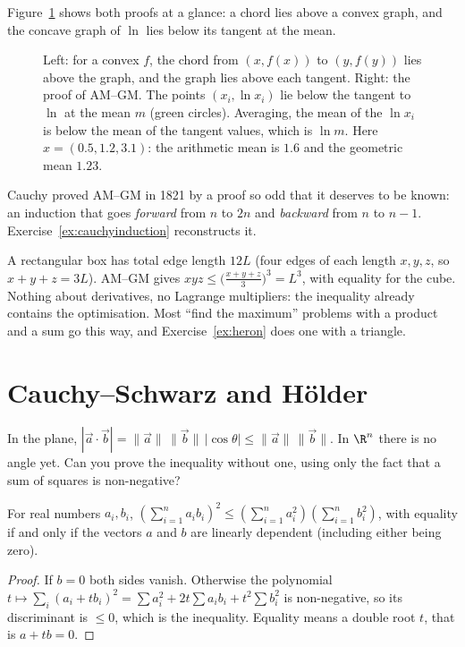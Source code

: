 Figure~\ref{fig:convex} shows both proofs at a glance: a chord lies above a convex graph, and the concave graph of $\ln$ lies below its tangent at the mean.

\begin{figure}[ht]
\centering
{}
\caption{Left: for a convex $f$, the chord from $(x,f(x))$ to $(y,f(y))$ lies above the graph, and the graph lies above each tangent. Right: the proof of AM--GM. The points $(x_i,\ln x_i)$ lie below the tangent to $\ln$ at the mean $m$ (green circles). Averaging, the mean of the $\ln x_i$ is below the mean of the tangent values, which is $\ln m$. Here $x=(0.5,1.2,3.1)$: the arithmetic mean is $1.6$ and the geometric mean $1.23$.}
\label{fig:convex}
\end{figure}

Cauchy proved AM--GM in 1821 by a proof so odd that it deserves to be known: an induction that goes \emph{forward} from $n$ to $2n$ and
\emph{backward} from $n$ to $n-1$. Exercise~\ref{ex:cauchyinduction} reconstructs it.

\begin{examplex}
A rectangular box has total edge length $12L$ (four edges of each length $x,y,z$, so $x+y+z=3L$). AM--GM gives $xyz\le\bigl(\frac{x+y+z}3\bigr)^3=L^3$,
with equality for the cube. Nothing about derivatives, no Lagrange multipliers: the inequality already contains the optimisation. Most ``find the
maximum'' problems with a product and a sum go this way, and Exercise~\ref{ex:heron} does one with a triangle.
\end{examplex}

\section{Cauchy--Schwarz and H\"older}

\begin{think}
In the plane, $|\vec a\cdot\vec b|=\|\vec a\|\,\|\vec b\|\,|\cos\theta|\le\|\vec a\|\,\|\vec b\|$. In $\R^n$ there is no angle yet. Can you prove the inequality without one, using only the fact that a sum of squares is non-negative?
\end{think}

\begin{theorem}\label{thm:cs}
For real numbers $a_i,b_i$,
$\displaystyle\left(\sum_{i=1}^na_ib_i\right)^2\le\left(\sum_{i=1}^na_i^2\right)\left(\sum_{i=1}^nb_i^2\right)$,
with equality if and only if the vectors $a$ and $b$ are linearly dependent (including either being zero).
\end{theorem}
\begin{proof}
If $b=0$ both sides vanish. Otherwise the polynomial $t\mapsto\sum_i(a_i+tb_i)^2=\sum a_i^2+2t\sum a_ib_i+t^2\sum b_i^2$ is non-negative, so its discriminant is $\le0$, which is the inequality.
Equality means a double root $t$, that is $a+tb=0$.
\end{proof}

